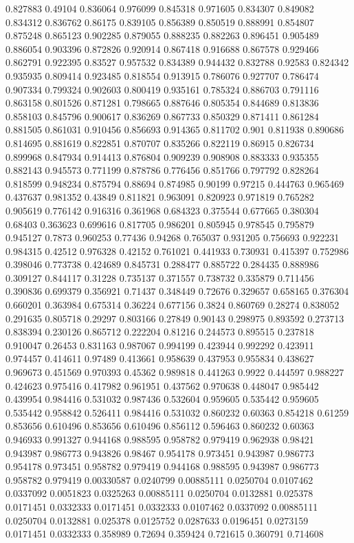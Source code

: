 0.827883 0.49104
0.836064 0.976099
0.845318 0.971605
0.834307 0.849082
0.834312 0.836762
0.86175 0.839105
0.856389 0.850519
0.888991 0.854807
0.875248 0.865123
0.902285 0.879055
0.888235 0.882263
0.896451 0.905489
0.886054 0.903396
0.872826 0.920914
0.867418 0.916688
0.867578 0.929466
0.862791 0.922395
0.83527 0.957532
0.834389 0.944432
0.832788 0.92583
0.824342 0.935935
0.809414 0.923485
0.818554 0.913915
0.786076 0.927707
0.786474 0.907334
0.799324 0.902603
0.800419 0.935161
0.785324 0.886703
0.791116 0.863158
0.801526 0.871281
0.798665 0.887646
0.805354 0.844689
0.813836 0.858103
0.845796 0.900617
0.836269 0.867733
0.850329 0.871411
0.861284 0.881505
0.861031 0.910456
0.856693 0.914365
0.811702 0.901
0.811938 0.890686
0.814695 0.881619
0.822851 0.870707
0.835266 0.822119
0.86915 0.826734
0.899968 0.847934
0.914413 0.876804
0.909239 0.908908
0.883333 0.935355
0.882143 0.945573
0.771199 0.878786
0.776456 0.851766
0.797792 0.828264
0.818599 0.948234
0.875794 0.88694
0.874985 0.90199
0.97215 0.444763
0.965469 0.437637
0.981352 0.43849
0.811821 0.963091
0.820923 0.971819
0.765282 0.905619
0.776142 0.916316
0.361968 0.684323
0.375544 0.677665
0.380304 0.68403
0.363623 0.699616
0.817705 0.986201
0.805945 0.978545
0.795879 0.945127
0.7873 0.960253
0.77436 0.94268
0.765037 0.931205
0.756693 0.922231
0.984315 0.42512
0.976328 0.42152
0.761021 0.441933
0.730931 0.415397
0.752986 0.398046
0.773738 0.424689
0.845731 0.288477
0.885722 0.284435
0.888986 0.309127
0.844117 0.31228
0.735137 0.371557
0.738732 0.335879
0.711456 0.390836
0.699379 0.356921
0.71437 0.348449
0.72676 0.329657
0.658165 0.376304
0.660201 0.363984
0.675314 0.36224
0.677156 0.3824
0.860769 0.28274
0.838052 0.291635
0.805718 0.29297
0.803166 0.27849
0.90143 0.298975
0.893592 0.273713
0.838394 0.230126
0.865712 0.222204
0.81216 0.244573
0.895515 0.237818
0.910047 0.26453
0.831163 0.987067
0.994199 0.423944
0.992292 0.423911
0.974457 0.414611
0.97489 0.413661
0.958639 0.437953
0.955834 0.438627
0.969673 0.451569
0.970393 0.45362
0.989818 0.441263
0.9922 0.444597
0.988227 0.424623
0.975416 0.417982
0.961951 0.437562
0.970638 0.448047
0.985442 0.439954
0.984416 0.531032
0.987436 0.532604
0.959605 0.535442
0.959605 0.535442
0.958842 0.526411
0.984416 0.531032
0.860232 0.60363
0.854218 0.61259
0.853656 0.610496
0.853656 0.610496
0.856112 0.596463
0.860232 0.60363
0.946933 0.991327
0.944168 0.988595
0.958782 0.979419
0.962938 0.98421
0.943987 0.986773
0.943826 0.98467
0.954178 0.973451
0.943987 0.986773
0.954178 0.973451
0.958782 0.979419
0.944168 0.988595
0.943987 0.986773
0.958782 0.979419
0.00330587 0.0240799
0.00885111 0.0250704
0.0107462 0.0337092
0.0051823 0.0325263
0.00885111 0.0250704
0.0132881 0.025378
0.0171451 0.0332333
0.0171451 0.0332333
0.0107462 0.0337092
0.00885111 0.0250704
0.0132881 0.025378
0.0125752 0.0287633
0.0196451 0.0273159
0.0171451 0.0332333
0.358989 0.72694
0.359424 0.721615
0.360791 0.714608

